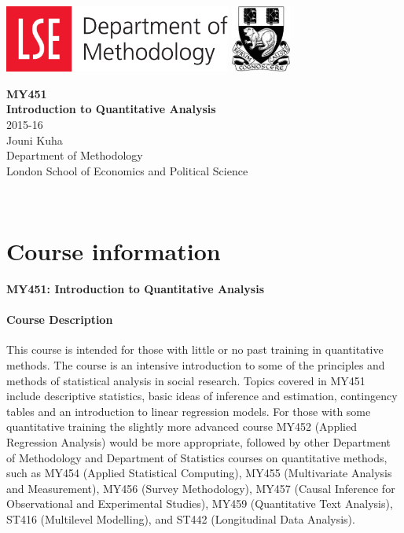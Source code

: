 \frontmatter
\thispagestyle{empty}

\includegraphics[height=2.2cm]{dept_of_methodology}
\hfill
\includegraphics[height=2.2cm]{lse}

\vspace*{3cm}
\begin{center}
{\LARGE \textbf{MY451}}\\[2ex]{\LARGE \textbf{Introduction to Quantitative Analysis}}
\\[7ex]
{\Large 2015-16}\\[15ex]
{\Large Jouni Kuha}\\[2ex]{\Large Department of Methodology}\\[1ex]{\Large London School of Economics and
Political Science}
\end{center}

\newpage
\thispagestyle{empty}

$\, $
\newpage
\setcounter{page}{1}


\chapter{Course information}


{\Large \textbf{MY451: Introduction to Quantitative Analysis}}


\subsubsection{Course Description}
This course is intended for those with little or no past training in
quantitative methods.  The course is an intensive introduction to some
of the principles and methods of statistical analysis in social
research.
Topics covered in MY451 include descriptive statistics, basic ideas of
inference and estimation, contingency tables and an introduction to
linear regression models.
For those with some quantitative training the slightly more
advanced course MY452 (Applied Regression Analysis) would be more
appropriate, followed by other Department of Methodology and Department
of Statistics courses on quantitative methods, such as MY454 (Applied Statistical Computing), MY455 (Multivariate Analysis and
Measurement), MY456 (Survey Methodology), MY457 (Causal Inference for
Observational and Experimental Studies),
MY459 (Quantitative Text Analysis),
ST416 (Multilevel Modelling), and ST442 (Longitudinal Data Analysis).

